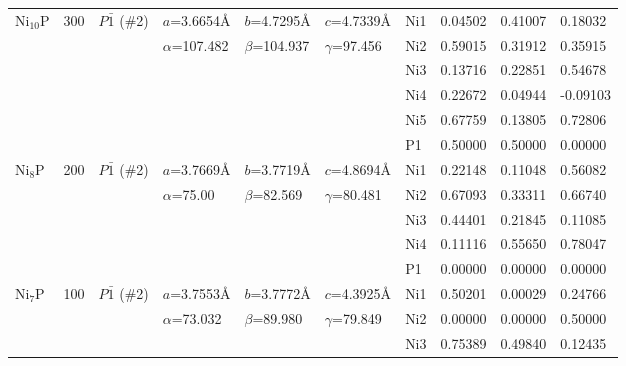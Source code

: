 \documentclass[twoside,twocolumn,9pt]{article}
\begin{document}
\begin{table}[t]
\begin{tabular*}{\textwidth}{@{\extracolsep{\fill}}llllllllll}
\midrule
    Ni$_{10}$P & 300 & $P\bar{1}$ (\#2)     & $a$=3.6654\AA    & $b$=4.7295\AA   & $c$=4.7339\AA    & Ni1 & 0.04502 & 0.41007 & 0.18032 \\
               &     &               & $\alpha$=107.482 & $\beta$=104.937 & $\gamma$=97.456  & Ni2 & 0.59015 & 0.31912 & 0.35915 \\
               &     &               &                  &                 &                  & Ni3 & 0.13716 & 0.22851 & 0.54678 \\
               &     &               &                  &                 &                  & Ni4 & 0.22672 & 0.04944 & -0.09103\\
               &     &               &                  &                 &                  & Ni5 & 0.67759 & 0.13805 & 0.72806 \\
               &     &               &                  &                 &                  & P1  & 0.50000 & 0.50000 & 0.00000 \\
\midrule
    Ni$_{8}$P  & 200 & $P\bar{1}$ (\#2)     & $a$=3.7669\AA    & $b$=3.7719\AA   & $c$=4.8694\AA    & Ni1 & 0.22148 & 0.11048 & 0.56082 \\
               &     &               & $\alpha$=75.00 & $\beta$=82.569 & $\gamma$=80.481     & Ni2 & 0.67093 & 0.33311 & 0.66740 \\
               &     &               &                  &                 &                  & Ni3 & 0.44401 & 0.21845 & 0.11085 \\
               &     &               &                  &                 &                  & Ni4 & 0.11116 & 0.55650 & 0.78047 \\
               &     &               &                  &                 &                  & P1  & 0.00000 & 0.00000 & 0.00000 \\
\midrule
    Ni$_{7}$P  & 100 & $P\bar{1}$ (\#2)     & $a$=3.7553\AA    & $b$=3.7772\AA   & $c$=4.3925\AA    & Ni1 &  0.50201 & 0.00029 & 0.24766 \\
               &     &               & $\alpha$=73.032 & $\beta$=89.980 & $\gamma$=79.849    & Ni2 &  0.00000 & 0.00000 & 0.50000 \\
               &     &               &                  &                 &                  & Ni3 &  0.75389 & 0.49840 & 0.12435 \\

\end{tabular*}
\end{table}
\end{document}
